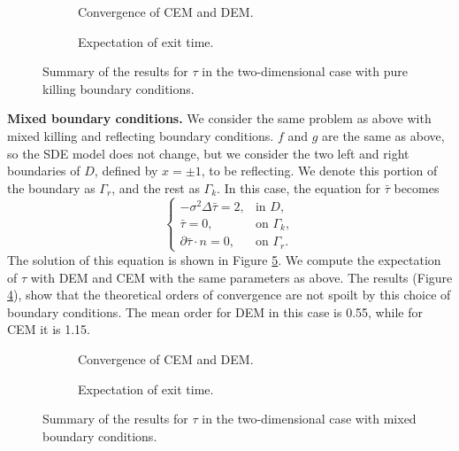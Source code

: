 \begin{figure}[t]
    \centering
    \begin{subfigure}{0.49\linewidth}
        \centering
        \resizebox{1\linewidth}{!}{ }  
        \caption{Convergence of CEM and DEM.}
        \label{fig:KillTwoD}
    \end{subfigure}
    \begin{subfigure}{0.49\linewidth}
        \centering
        \resizebox{1\linewidth}{!}{ }  
        \caption{Expectation of exit time.}
        \label{fig:TauExact2DKill}
    \end{subfigure}    
    \caption{Summary of the results for $\tau$ in the two-dimensional case with pure killing boundary conditions.}
    \label{fig:OrdersTwoDKill}
\end{figure}
\vspace{2mm}
\noindent\textbf{Mixed boundary conditions.} We consider the same problem as above with mixed killing and reflecting boundary conditions. $f$ and $g$ are the same as above, so the SDE model does not change, but we consider the two left and right boundaries of $D$, defined by $x = \pm 1$, to be reflecting. We denote this portion of the boundary as $\Gamma_r$, and the rest as $\Gamma_k$. In this case, the equation for $\bar\tau$ becomes
\begin{equation}\label{eq:PDETau2DKilling}
\begin{cases}
	- \sigma^2 \Delta \bar \tau = 2, & \text{in } D, \\
	\bar \tau = 0, & \text{on } \Gamma_k, \\
	\partial \bar \tau \cdot n = 0, & \text{on } \Gamma_r.
\end{cases}
\end{equation}
The solution of this equation is shown in Figure \ref{fig:TauExact2DRefl}. We compute the expectation of $\tau$ with DEM and CEM with the same parameters as above. The results (Figure \ref{fig:ReflTwoD}), show that the theoretical orders of convergence are not spoilt by this choice of boundary conditions. The mean order for DEM in this case is 0.55, while for CEM it is 1.15.


\begin{figure}[t]
    \centering
    \begin{subfigure}{0.49\linewidth}
        \centering
        \resizebox{1\linewidth}{!}{ }  
        \caption{Convergence of CEM and DEM.}
        \label{fig:ReflTwoD}
    \end{subfigure}
    \begin{subfigure}{0.49\linewidth}
        \centering
        \resizebox{1\linewidth}{!}{ }  
        \caption{Expectation of exit time.}
        \label{fig:TauExact2DRefl}
    \end{subfigure}    
    \caption{Summary of the results for $\tau$ in the two-dimensional case with mixed boundary conditions.}
    \label{fig:OrdersTwoDRefl}
\end{figure}
